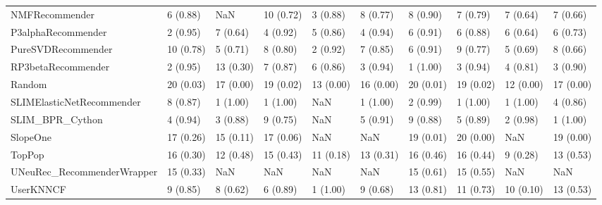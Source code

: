 \begin{tabular}{llllllllll}
                     NMFRecommender &                 6 (0.88) &         NaN &     10 (0.72) &     3 (0.88) &             8 (0.77) &            8 (0.90) &          7 (0.79) &           7 (0.64) &          7 (0.66) \\
                 P3alphaRecommender &                 2 (0.95) &    7 (0.64) &      4 (0.92) &     5 (0.86) &             4 (0.94) &            6 (0.91) &          6 (0.88) &           6 (0.64) &          6 (0.73) \\
                 PureSVDRecommender &                10 (0.78) &    5 (0.71) &      8 (0.80) &     2 (0.92) &             7 (0.85) &            6 (0.91) &          9 (0.77) &           5 (0.69) &          8 (0.66) \\
                 RP3betaRecommender &                 2 (0.95) &   13 (0.30) &      7 (0.87) &     6 (0.86) &             3 (0.94) &            1 (1.00) &          3 (0.94) &           4 (0.81) &          3 (0.90) \\
                             Random &                20 (0.03) &   17 (0.00) &     19 (0.02) &    13 (0.00) &            16 (0.00) &           20 (0.01) &         19 (0.02) &          12 (0.00) &         17 (0.00) \\
          SLIMElasticNetRecommender &                 8 (0.87) &    1 (1.00) &      1 (1.00) &          NaN &             1 (1.00) &            2 (0.99) &          1 (1.00) &           1 (1.00) &          4 (0.86) \\
                    SLIM\_BPR\_Cython &                 4 (0.94) &    3 (0.88) &      9 (0.75) &          NaN &             5 (0.91) &            9 (0.88) &          5 (0.89) &           2 (0.98) &          1 (1.00) \\
                           SlopeOne &                17 (0.26) &   15 (0.11) &     17 (0.06) &          NaN &                  NaN &           19 (0.01) &         20 (0.00) &                NaN &         19 (0.00) \\
                             TopPop &                16 (0.30) &   12 (0.48) &     15 (0.43) &    11 (0.18) &            13 (0.31) &           16 (0.46) &         16 (0.44) &           9 (0.28) &         13 (0.53) \\
         UNeuRec\_RecommenderWrapper &                15 (0.33) &         NaN &           NaN &          NaN &                  NaN &           15 (0.61) &         15 (0.55) &                NaN &               NaN \\
                          UserKNNCF &                 9 (0.85) &    8 (0.62) &      6 (0.89) &     1 (1.00) &             9 (0.68) &           13 (0.81) &         11 (0.73) &          10 (0.10) &         13 (0.53) \\
\bottomrule
\end{tabular}
